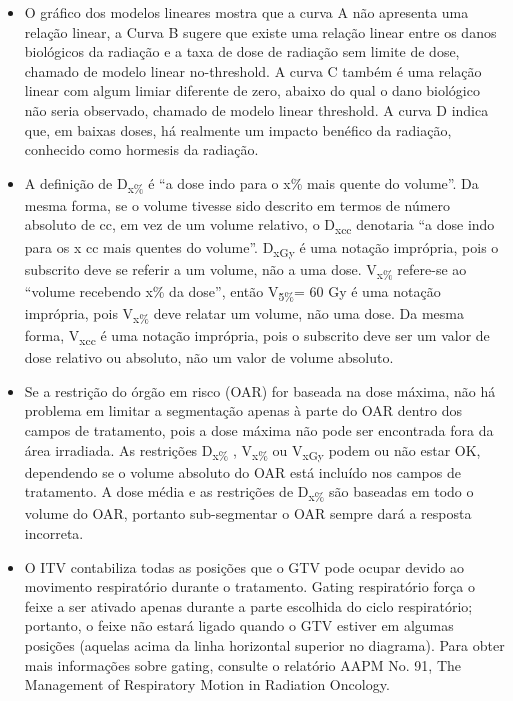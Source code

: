 \documentclass[11pt,a4paper]{article}
\newcounter{exemplo}
\begin{document}
\begin{exemplo}[Medicina]

    \begin{itemize}

        \item   O gráfico dos modelos lineares mostra que a curva A não apresenta uma relação linear, a Curva B sugere que existe uma relação linear entre os danos biológicos da radiação e a taxa de dose de radiação sem limite de dose, chamado de modelo linear no-threshold. A curva C também é uma relação linear com algum limiar diferente de zero, abaixo do qual o dano biológico não seria observado, chamado de modelo linear threshold. A curva D indica que, em baixas doses, há realmente um impacto benéfico da radiação, conhecido como hormesis da radiação.
        
        \item A definição de D\textsubscript{x\%} é “a dose indo para o x\% mais quente do volume”. Da mesma forma, se o volume tivesse sido descrito em termos de número absoluto de cc, em vez de um volume relativo, o D\textsubscript{xcc} denotaria “a dose indo para os x cc mais quentes do volume”. D\textsubscript{xGy} é uma notação imprópria, pois o subscrito deve se referir a um volume, não a uma dose. V\textsubscript{x\%} refere-se ao “volume recebendo x\% da dose”, então V\textsubscript{5\%}= 60 Gy é uma notação imprópria, pois V\textsubscript{x\%} deve relatar um volume, não uma dose. Da mesma forma, V\textsubscript{xcc} é uma notação imprópria, pois o subscrito deve ser um valor de dose relativo ou absoluto, não um valor de volume absoluto.
        
        \item Se a restrição do órgão em risco (OAR) for baseada na dose máxima, não há problema em limitar a segmentação apenas à parte do OAR dentro dos campos de tratamento, pois a dose máxima não pode ser encontrada fora da área irradiada. As restrições D\textsubscript{x\%} , V\textsubscript{x\%} ou V\textsubscript{xGy} podem ou não estar OK, dependendo se o volume absoluto do OAR está incluído nos campos de tratamento. A dose média e as restrições de D\textsubscript{x\%} são baseadas em todo o volume do OAR, portanto sub-segmentar o OAR sempre dará a resposta incorreta.
        
        \item O ITV contabiliza todas as posições que o GTV pode ocupar devido ao movimento respiratório durante o tratamento. Gating respiratório força o feixe a ser ativado apenas durante a parte escolhida do ciclo respiratório; portanto, o feixe não estará ligado quando o GTV estiver em algumas posições (aquelas acima da linha horizontal superior no diagrama). Para obter mais informações sobre gating, consulte o relatório AAPM No. 91, The Management of Respiratory Motion in Radiation Oncology. 
        

\end{itemize}
\end{exemplo}
\end{document}
